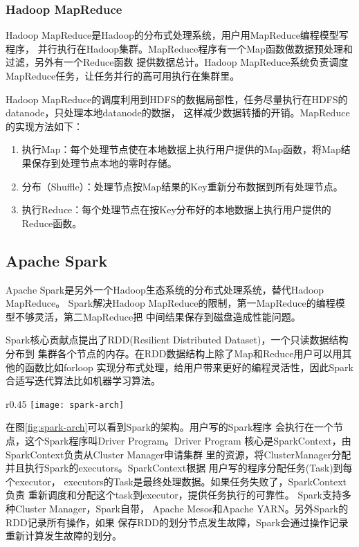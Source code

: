 \subsubsection{Hadoop MapReduce}
Hadoop MapReduce是Hadoop的分布式处理系统，用户用MapReduce编程模型写程序，
并行执行在Hadoop集群。MapReduce程序有一个Map函数做数据预处理和过滤，另外有一个Reduce函数
提供数据总计。Hadoop MapReduce系统负责调度MapReduce任务，让任务并行的高可用执行在集群里。

Hadoop MapReduce的调度利用到HDFS的数据局部性，任务尽量执行在HDFS的datanode，只处理本地datanode的数据，
这样减少数据转播的开销。MapReduce的实现方法如下：
\begin{enumerate}
  \item 执行Map：每个处理节点使在本地数据上执行用户提供的Map函数，将Map结果保存到处理节点本地的零时存储。
  \item 分布（Shuffle）：处理节点按Map结果的Key重新分布数据到所有处理节点。
  \item 执行Reduce：每个处理节点在按Key分布好的本地数据上执行用户提供的Reduce函数。
\end{enumerate}

\subsection{Apache Spark}
\label{subsubsec:spark}
Apache Spark是另外一个Hadoop生态系统的分布式处理系统，替代Hadoop MapReduce。
Spark解决Hadoop MapReduce的限制，第一MapReduce的编程模型不够灵活，第二MapReduce把
中间结果保存到磁盘造成性能问题。

Spark核心贡献点提出了RDD(Resilient Distributed Dataset)，一个只读数据结构分布到
集群各个节点的内存。在RDD数据结构上除了Map和Reduce用户可以用其他的函数比如forloop
实现分布式处理，给用户带来更好的编程灵活性，因此Spark合适写迭代算法比如机器学习算法。

\begin{wrapfigure}{r}{0.45\textwidth}
  \centering
    \texttt{[image: spark-arch]}
    \caption{Spark集群的架构。源：\cite{spark_arch_doc}}
  \label{fig:spark-arch}
\end{wrapfigure}
在图\ref{fig:spark-arch}可以看到Spark的架构。用户写的Spark程序
会执行在一个节点，这个Spark程序叫Driver Program。Driver Program
核心是SparkContext，由SparkContext负责从Cluster Manager申请集群
里的资源，将ClusterManager分配并且执行Spark的executors。SparkContext根据
用户写的程序分配任务(Task)到每个executor，
executors的Task是最终处理数据。如果任务失败了，SparkContext负责
重新调度和分配这个task到executor，提供任务执行的可靠性。
Spark支持多种Cluster Manager，Spark自带，
Apache Mesos和Apache YARN。另外Spark的RDD记录所有操作，如果
保存RDD的划分节点发生故障，Spark会通过操作记录重新计算发生故障的划分。


